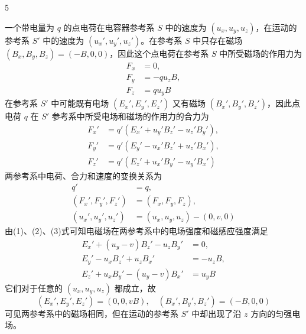 \begin{solution}{5}
\begin{subsolution}
一个带电量为 $q$ 的点电荷在电容器参考系 $S$ 中的速度为 $(u_x, u_y, u_z)$，在运动的参考系 $S'$ 中的速度为 $(u_x', u_y', u_z')$。在参考系 $S$ 中只存在磁场 $(B_x, B_y, B_z) = (-B, 0, 0)$，因此这个点电荷在参考系 $S$ 中所受磁场的作用力为
\begin{align}
F_x &= 0, \nonumber\\
F_y &= -q u_z B, \nonumber\\
F_z &= q u_y B \nonumber
\end{align}
在参考系 $S'$ 中可能既有电场 $(E_x', E_y', E_z')$ 又有磁场 $(B_x', B_y', B_z')$，因此点电荷 $q$ 在 $S'$ 参考系中所受电场和磁场的作用力的合力为
\begin{align}
F_x' &= q'(E_x' + u_y' B_z' - u_z' B_y'), \nonumber\\
F_y' &= q'(E_y' - u_x' B_z' + u_z' B_x'), \nonumber\\
F_z' &= q'(E_z' + u_x' B_y' - u_y' B_x') \nonumber
\end{align}
两参考系中电荷、合力和速度的变换关系为
\begin{align}
q' &= q, \nonumber\\
(F_x', F_y', F_z') &= (F_x, F_y, F_z), \nonumber\\
(u_x', u_y', u_z') &= (u_x, u_y, u_z) - (0, v, 0) \nonumber
\end{align}
由(1)、(2)、(3)式可知电磁场在两参考系中的电场强度和磁感应强度满足
\begin{align}
E_x' + (u_y - v) B_z' - u_z B_y' &= 0, \nonumber\\
E_y' - u_x B_z' + u_z B_x' &= -u_z B, \nonumber\\
E_z' + u_x B_y' - (u_y - v) B_x' &= u_y B \nonumber
\end{align}
它们对于任意的 $(u_x, u_y, u_z)$ 都成立，故
\begin{equation}
(E_x', E_y', E_z') = (0, 0, v B), \quad (B_x', B_y', B_z') = (-B, 0, 0)
\label{eq:5.s5}
\end{equation}
可见两参考系中的磁场相同，但在运动的参考系 $S'$ 中却出现了沿 $z$ 方向的匀强电场。
\end{subsolution}


\end{solution}
